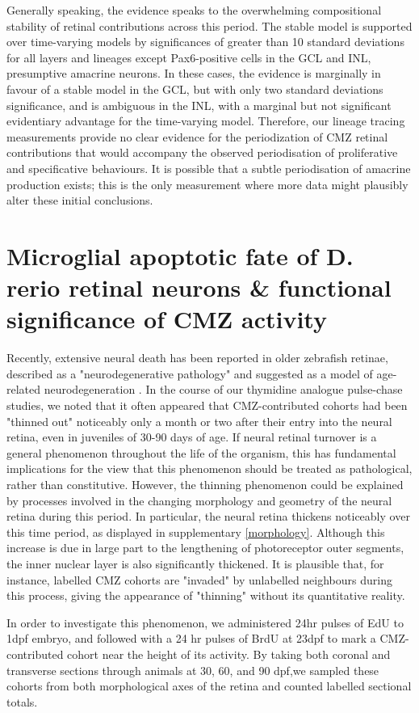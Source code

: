 Generally speaking, the evidence speaks to the overwhelming compositional stability of retinal contributions across this period. The stable model is supported over time-varying models by significances of greater than 10 standard deviations for all layers and lineages except Pax6-positive cells in the GCL and INL, presumptive amacrine neurons. In these cases, the evidence is marginally in favour of a stable model in the GCL, but with only two standard deviations significance, and is ambiguous in the INL, with a marginal but not significant evidentiary advantage for the time-varying model. Therefore, our lineage tracing measurements provide no clear evidence for the periodization of CMZ retinal contributions that would accompany the observed periodisation of proliferative and specificative behaviours. It is possible that a subtle periodisation of amacrine production exists; this is the only measurement where more data might plausibly alter these initial conclusions. 

\section{Microglial apoptotic fate of D. rerio retinal neurons \& functional significance of CMZ activity}
\label{sec:neuralfate}
Recently, extensive neural death has been reported in older zebrafish retinae, described as a "neurodegenerative pathology" and suggested as a model of age-related neurodegeneration \cite{Vanhoucke2018}. In the course of our thymidine analogue pulse-chase studies, we noted that it often appeared that CMZ-contributed cohorts had been "thinned out" noticeably only a month or two after their entry into the neural retina, even in juveniles of 30-90 days of age. If neural retinal turnover is a general phenomenon throughout the life of the organism, this has fundamental implications for the view that this phenomenon should be treated as pathological, rather than constitutive. However, the thinning phenomenon could be explained by processes involved in the changing morphology and geometry of the neural retina during this period. In particular, the neural retina thickens noticeably over this time period, as displayed in supplementary \autoref{morphology}. Although this increase is due in large part to the lengthening of photoreceptor outer segments, the inner nuclear layer is also significantly thickened. It is plausible that, for instance, labelled CMZ cohorts are "invaded" by unlabelled neighbours during this process, giving the appearance of "thinning" without its quantitative reality.

In order to investigate this phenomenon, we administered 24hr pulses of EdU to 1dpf embryo, and followed with a 24 hr pulses of BrdU at 23dpf to mark a CMZ-contributed cohort near the height of its activity. By taking both coronal and transverse sections through animals at 30, 60, and 90 dpf,we sampled these cohorts from both morphological axes of the retina and counted labelled sectional totals. 

